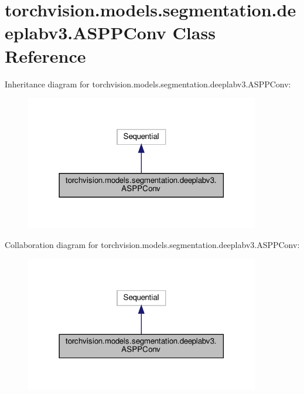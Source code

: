 \hypertarget{classtorchvision_1_1models_1_1segmentation_1_1deeplabv3_1_1ASPPConv}{}\section{torchvision.\+models.\+segmentation.\+deeplabv3.\+A\+S\+P\+P\+Conv Class Reference}
\label{classtorchvision_1_1models_1_1segmentation_1_1deeplabv3_1_1ASPPConv}


Inheritance diagram for torchvision.\+models.\+segmentation.\+deeplabv3.\+A\+S\+P\+P\+Conv\+:
\nopagebreak
\begin{figure}[H]
\begin{center}
\leavevmode
\includegraphics[width=290pt]{classtorchvision_1_1models_1_1segmentation_1_1deeplabv3_1_1ASPPConv__inherit__graph}
\end{center}
\end{figure}


Collaboration diagram for torchvision.\+models.\+segmentation.\+deeplabv3.\+A\+S\+P\+P\+Conv\+:
\nopagebreak
\begin{figure}[H]
\begin{center}
\leavevmode
\includegraphics[width=290pt]{classtorchvision_1_1models_1_1segmentation_1_1deeplabv3_1_1ASPPConv__coll__graph}
\end{center}
\end{figure}
